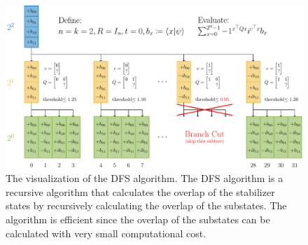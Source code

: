 \documentclass[\main/main]{subfiles}
\begin{document}
\begin{figure}[htbp]
  \centering
  \includegraphics[width=\columnwidth]{imgs/dfs.pdf}
  \caption{
    The visualization of the DFS algorithm.
    The DFS algorithm is a recursive algorithm
    that calculates the overlap of the stabilizer states
    by recursively calculating the overlap of the substates.
    The algorithm is efficient since the overlap of the substates
    can be calculated with very small computational cost.
  }
  \label{fig:dfs}
\end{figure}
\end{document}
